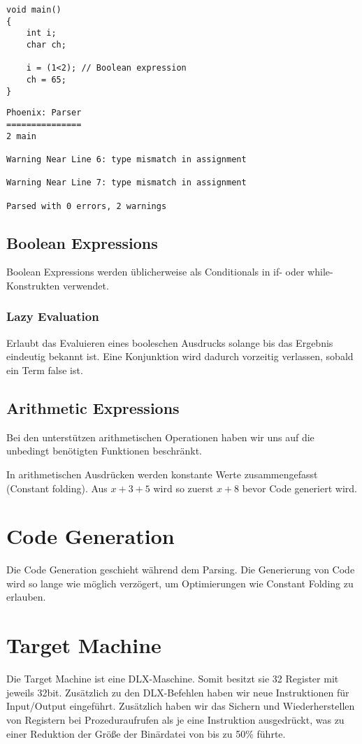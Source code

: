 \documentclass[a4paper,12pt]{article}
\begin{document}
	\begin{lstlisting}[title=types.c,frame=single]
void main()
{
	int i;
	char ch;

	i = (1<2); // Boolean expression
	ch = 65;
}\end{lstlisting}

	\begin{lstlisting}[title=Ausgabe des Compilers,frame=single]
Phoenix: Parser
===============
2 main

Warning Near Line 6: type mismatch in assignment

Warning Near Line 7: type mismatch in assignment

Parsed with 0 errors, 2 warnings
\end{lstlisting}

	\subsection{Boolean Expressions}

	Boolean Expressions werden üblicherweise als Conditionals in if- oder while-Konstrukten verwendet.

	\subsubsection{Lazy Evaluation}

	Erlaubt das Evaluieren eines booleschen Ausdrucks solange bis das Ergebnis eindeutig bekannt ist.
	Eine Konjunktion wird dadurch vorzeitig verlassen, sobald ein Term false ist.

	\subsection{Arithmetic Expressions}
	Bei den unterstützen arithmetischen Operationen haben wir uns auf die unbedingt benötigten Funktionen beschränkt.

	In arithmetischen Ausdrücken werden konstante Werte zusammengefasst (Constant folding).
	Aus $x + 3 + 5$ wird so zuerst $x+8$ bevor Code generiert wird.

	\section{Code Generation}
	Die Code Generation geschieht während dem Parsing.
	Die Generierung von Code wird so lange wie möglich verzögert, um Optimierungen wie Constant Folding zu erlauben.

	\section{Target Machine}
	Die Target Machine ist eine DLX-Maschine.
	Somit besitzt sie 32 Register mit jeweils 32bit.
	Zusätzlich zu den DLX-Befehlen haben wir neue Instruktionen für Input/Output eingeführt.
	Zusätzlich haben wir das Sichern und Wiederherstellen von Registern bei Prozeduraufrufen als je eine Instruktion ausgedrückt,
	was zu einer Reduktion der Größe der Binärdatei von bis zu 50\% führte.
\end{document}
